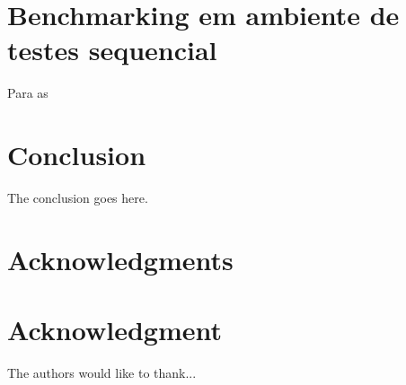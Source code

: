 \documentclass[conference,compsoc]{IEEEtran}
\begin{document}


\section{Benchmarking em ambiente de testes sequencial}

Para as 


\section{Conclusion}
The conclusion goes here.







\ifCLASSOPTIONcompsoc
  \section*{Acknowledgments}
\else
  \section*{Acknowledgment}
\fi


The authors would like to thank...






\end{document}
